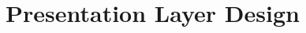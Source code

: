 \documentclass[12pt,a4paper]{report}
\begin{document}

\section{Presentation Layer Design}
\end{document}
